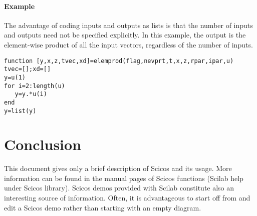 \documentclass{article}
\begin{document}
\paragraph{Example}
The advantage of coding inputs and outputs as lists is that
the number of inputs and outputs need not be specified
explicitly. In this example, the output is the element-wise
product of all the input vectors, regardless of the number
of inputs.

\begin{verbatim}
function [y,x,z,tvec,xd]=elemprod(flag,nevprt,t,x,z,rpar,ipar,u)
tvec=[];xd=[]
y=u(1)
for i=2:length(u)
   y=y.*u(i)
end
y=list(y)
\end{verbatim}

\section{Conclusion}
This document gives only a brief description of Scicos and its
usage. More information can be found in the manual pages of Scicos
functions (Scilab help under Scicos library). Scicos demos provided with
Scilab constitute also an interesting source of information. Often,
it is advantageous to start off from and edit a Scicos demo rather than
starting with an empty diagram.

\newpage 

\tableofcontents
\end{document}
